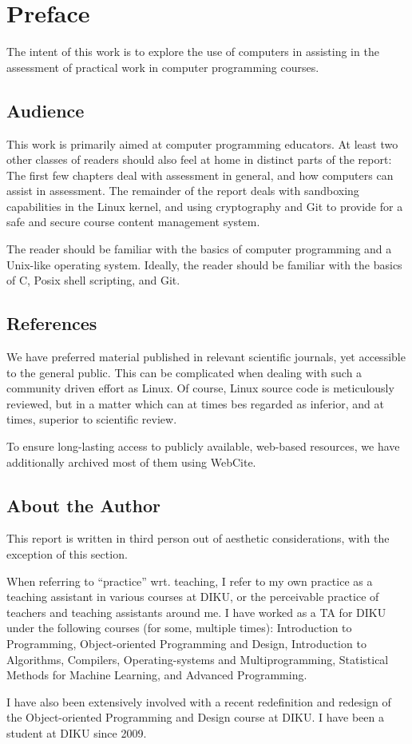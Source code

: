 
\chapter{Preface}

The intent of this work is to explore the use of computers in assisting in the
assessment of practical work in computer programming courses.

\section{Audience}

This work is primarily aimed at computer programming educators. At least two
other classes of readers should also feel at home in distinct parts of the
report: The first few chapters deal with assessment in general, and how
computers can assist in assessment. The remainder of the report deals with
sandboxing capabilities in the Linux kernel, and using cryptography and Git to
provide for a safe and secure course content management system.

The reader should be familiar with the basics of computer programming and a
Unix-like operating system. Ideally, the reader should be familiar with the
basics of C, Posix shell scripting, and Git.

\section{References}

We have preferred material published in relevant scientific journals, yet
accessible to the general public. This can be complicated when dealing with
such a community driven effort as Linux. Of course, Linux source code is
meticulously reviewed, but in a matter which can at times bes regarded as
inferior, and at times, superior to scientific review.

To ensure long-lasting access to publicly available, web-based resources, we
have additionally archived most of them using
WebCite\textsuperscript{\textregistered}.

\section{About the Author}

This report is written in third person out of aesthetic considerations, with
the exception of this section.

When referring to ``practice'' wrt. teaching, I refer to my own practice as a
teaching assistant in various courses at DIKU, or the perceivable practice of
teachers and teaching assistants around me. I have worked as a TA for DIKU
under the following courses (for some, multiple times): Introduction to
Programming, Object-oriented Programming and Design, Introduction to
Algorithms, Compilers, Operating-systems and Multiprogramming, Statistical
Methods for Machine Learning, and Advanced Programming.

I have also been extensively involved with a recent redefinition and redesign
of the Object-oriented Programming and Design course at DIKU. I have been a
student at DIKU since 2009.

